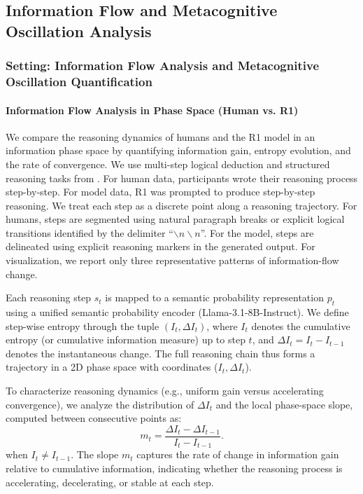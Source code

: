 \subsection{Information Flow and Metacognitive Oscillation Analysis}
\label{append:information}

\subsubsection{Setting: Information Flow Analysis and Metacognitive Oscillation Quantification}

\paragraph{\textbf{Information Flow Analysis in Phase Space (Human vs. R1)} }
We compare the reasoning dynamics of humans and the R1 model in an information phase space by quantifying information gain, entropy evolution, and the rate of convergence.
We use multi-step logical deduction and structured reasoning tasks from \citet{du2025the}. For human data, participants wrote their reasoning process step-by-step. For model data, R1 was prompted to produce step-by-step reasoning. We treat each step as a discrete point along a reasoning trajectory. For humans, steps are segmented using natural paragraph breaks or explicit logical transitions identified by the delimiter ``$\backslash n\backslash n$''. For the model, steps are delineated using explicit reasoning markers in the generated output. For visualization, we report only three representative patterns of information-flow change.

Each reasoning step \(s_t\) is mapped to a semantic probability representation \(p_t\) using a unified semantic probability encoder (Llama-3.1-8B-Instruct). We define step-wise entropy through the tuple \((I_t, \Delta I_t)\), where \(I_t\) denotes the cumulative entropy (or cumulative information measure) up to step \(t\), and \(\Delta I_t = I_t - I_{t-1}\) denotes the instantaneous change. The full reasoning chain thus forms a trajectory in a 2D phase space with coordinates (\(I_t, \Delta I_t\)).

To characterize reasoning dynamics (e.g., uniform gain versus accelerating convergence), we analyze the distribution of  \(\Delta I_t\) and the local phase-space slope, computed between consecutive points as:
\begin{equation}
  m_t = \frac{\Delta I_t - \Delta I_{t-1}}{I_t - I_{t-1}}.
\end{equation}
when $I_t \neq I_{t-1}$. The slope \(m_t\) captures the rate of change in information gain relative to cumulative information, indicating whether the reasoning process is accelerating, decelerating, or stable at each step.\vspace{-5pt}


